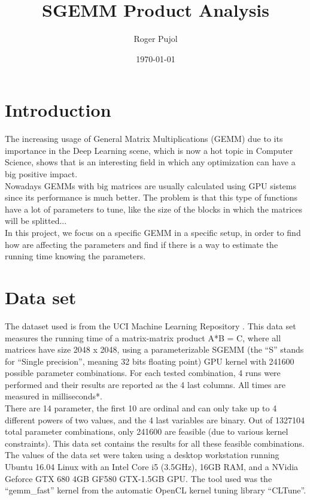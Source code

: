 \documentclass[sigconf,authorversion]{acmart}
\title{SGEMM Product Analysis}
\author{Roger Pujol}
\affiliation{%
  \institution{Universitat Politècnica de Catalunya (UPC)}
  \city{Barcelona}
  \country{Spain}}
\date{\today}
\begin{document}
\maketitle

\section{Introduction}
The increasing usage of General Matrix Multiplications (GEMM) due to its importance in the Deep Learning scene, which is now a hot topic in Computer Science, shows that is an interesting field in which any optimization can have a big positive impact.\\
Nowadays GEMMs with big matrices are usually calculated using GPU sistems since its performance is much better. The problem is that this type of functions have a lot of parameters to tune, like the size of the blocks in which the matrices will be splitted...\\
In this project, we focus on a specific GEMM in a specific setup, in order to find how are affecting the parameters and find if there is a way to estimate the running time knowing the parameters.

\section{Data set}
The dataset used is from the UCI Machine Learning Repository \cite{dataset-url} \cite{dataset-paper}. This data set measures the running time of a matrix-matrix product A*B = C, where all matrices have size 2048 x 2048, using a parameterizable SGEMM (the ``S'' stands for ``Single precision'', meaning 32 bits floating point) GPU kernel with 241600 possible parameter combinations. For each tested combination, 4 runs were performed and their results are reported as the 4 last columns. All times are measured in milliseconds*. \\
There are 14 parameter, the first 10 are ordinal and can only take up to 4 different powers of two values, and the 4 last variables are binary. Out of 1327104 total parameter combinations, only 241600 are feasible (due to various kernel constraints). This data set contains the results for all these feasible combinations.\\
The values of the data set were taken using a desktop workstation running Ubuntu 16.04 Linux with an Intel Core i5 (3.5GHz), 16GB RAM, and a NVidia Geforce GTX 680 4GB GF580 GTX-1.5GB GPU. The tool used was the ``gemm\_fast'' kernel from the automatic OpenCL kernel tuning library ``CLTune''.
\end{document}
